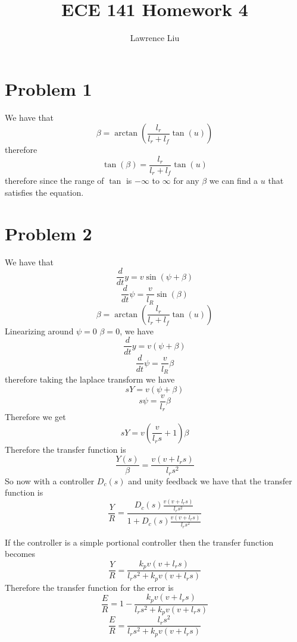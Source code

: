 \documentclass[12pt]{article}
\title{ECE 141 Homework 4}
\author{Lawrence Liu}
\begin{document}
\maketitle
\section*{Problem 1}
We have that $$\beta=\arctan(\frac{l_r}{l_r+l_f}\tan(u))$$
therefore
$$\tan(\beta)=\frac{l_r}{l_r+l_f}\tan(u)$$
therefore since the range of $\tan$ is $-\infty$ to $\infty$ for any $\beta$ we can find a $u$ that satisfies the equation.

\section*{Problem 2}
We have that
$$\frac{d}{dt}y=v\sin(\psi+\beta)$$
$$\frac{d}{dt}\psi=\frac{v}{l_R}\sin(\beta)$$
$$\beta=\arctan(\frac{l_r}{l_r+l_f}\tan(u))$$
Linearizing around $\psi=0$ $\beta=0$, we have
$$\frac{d}{dt}y=v(\psi+\beta)$$
$$\frac{d}{dt}\psi=\frac{v}{l_R}\beta$$
therefore taking the laplace transform we have
$$sY=v(\psi+\beta)$$
$$s\psi=\frac{v}{l_r}\beta$$
Therefore we get
$$sY=v(\frac{v}{l_r s}+1)\beta$$
Therefore the transfer function is
$$\frac{Y(s)}{\beta}=\frac{v(v+l_r s)}{l_r s^2}$$
So now with a controller $D_c(s)$ and unity feedback we have that the transfer function is
$$\frac{Y}{R}=\frac{D_c(s)\frac{v(v+l_r s)}{l_r s^2}}{1+D_c(s)\frac{v(v+l_r s)}{l_r s^2}}$$

If the controller is a simple portional controller then the transfer function becomes
$$\frac{Y}{R}=\frac{k_pv(v+l_r s)}{l_r s^2+k_pv(v+l_r s)}$$
Therefore the transfer function for the error is 
$$\frac{E}{R}=1-\frac{k_pv(v+l_r s)}{l_r s^2+k_pv(v+l_r s)}$$
$$\frac{E}{R}=\frac{l_r s^2}{l_r s^2+k_pv(v+l_r s)}$$
\end{document}
